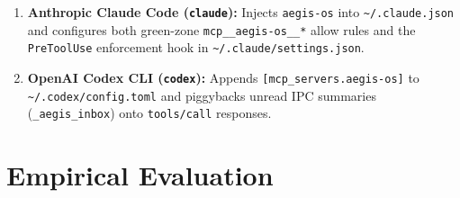\documentclass[10pt,twocolumn]{article}
\begin{document}
\begin{enumerate}
\begin{itemize}
    \end{itemize}
    \item \textbf{Anthropic Claude Code (\texttt{claude}):} Injects \texttt{aegis-os} into \texttt{\textasciitilde/.claude.json} and configures both green-zone \texttt{mcp\_\_\allowbreak aegis-os\_\_*} allow rules and the \texttt{PreToolUse} enforcement hook in \texttt{\textasciitilde/.claude/\allowbreak settings.json}.
    \item \textbf{OpenAI Codex CLI (\texttt{codex}):} Appends \texttt{[mcp\_servers.\allowbreak aegis-os]} to \texttt{\textasciitilde/.codex/\allowbreak config.toml} and piggybacks unread IPC summaries (\texttt{\_aegis\_inbox}) onto \texttt{tools/call} responses.
\end{enumerate}

\section{Empirical Evaluation}
\label{sec:eval}
\end{document}
